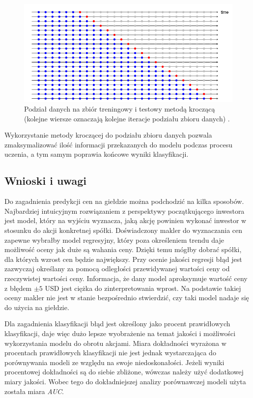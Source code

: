 \documentclass[a4paper, twoside, 11pt, openright]{article}
\begin{document}
\begin{figure}[H]
\centering 
\includegraphics[scale=0.75]{img/train_test_split_time_series.png}
\caption{Podział danych na zbiór treningowy i testowy metodą kroczącą (kolejne wiersze oznaczają kolejne iteracje podziału zbioru danych) \cite{train_test_split_time_series}.}
\label{img:train_test_split_time_series}
\end{figure}

Wykorzystanie metody kroczącej do podziału zbioru danych pozwala zmaksymalizować ilość informacji przekazanych do modelu podczas procesu uczenia, a tym samym poprawia końcowe wyniki klasyfikacji. 


\subsection{Wnioski i uwagi}

Do zagadnienia predykcji cen na giełdzie można podchodzić na kilka sposobów. Najbardziej intuicyjnym rozwiązaniem z perspektywy początkującego inwestora jest model, który na wyjściu wyznacza, jaką akcję powinien wykonać inwestor w stosunku do akcji konkretnej spółki. Doświadczony makler do wyznaczania cen zapewne wybrałby model regresyjny, który poza określeniem trendu daje możliwość oceny jak duże są wahania ceny. Dzięki temu mógłby dobrać spółki, dla których wzrost cen będzie największy. Przy ocenie jakości regresji błąd jest zazwyczaj określany za pomocą odległości przewidywanej wartości ceny od rzeczywistej wartości ceny. Informacja, że dany model aproksymuje wartość ceny z błędem $\pm 5$ USD jest ciężka do zinterpretowania wprost. Na podstawie takiej oceny makler nie jest w stanie bezpośrednio stwierdzić, czy taki model nadaje się do użycia na giełdzie.

\bigskip

 Dla zagadnienia klasyfikacji błąd jest określony jako procent prawidłowych klasyfikacji, daje więc dużo lepsze wyobrażenie na temat jakości i możliwości wykorzystania modelu do obrotu akcjami. Miara dokładności wyrażona w procentach prawidłowych klasyfikacji nie jest jednak wystarczająca do porównywania modeli ze względu na swoje niedoskonałości. Jeżeli wyniki procentowej dokładności są do siebie zbliżone, wówczas należy użyć dodatkowej miary jakości. Wobec tego do dokładniejszej analizy porównawczej modeli użyta została miara \textit{AUC}.
\end{document}

